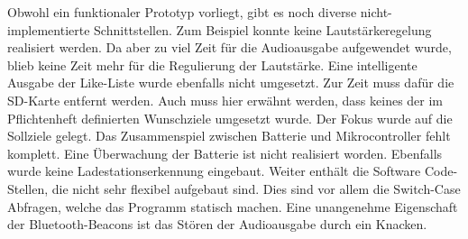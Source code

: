 Obwohl ein funktionaler Prototyp vorliegt, gibt es noch diverse nicht-implementierte Schnittstellen. Zum Beispiel konnte keine Lautstärkeregelung realisiert werden. Da aber zu viel Zeit für die Audioausgabe aufgewendet wurde, blieb keine Zeit mehr für die Regulierung der Lautstärke. Eine intelligente Ausgabe der {\glqq Like-Liste\grqq} wurde ebenfalls nicht umgesetzt. Zur Zeit muss dafür die SD-Karte entfernt werden. Auch muss hier erwähnt werden, dass keines der im Pflichtenheft definierten Wunschziele umgesetzt wurde. Der Fokus wurde auf die Sollziele gelegt. Das Zusammenspiel zwischen Batterie und Mikrocontroller fehlt komplett. Eine Überwachung der Batterie ist nicht realisiert worden. Ebenfalls wurde keine Ladestationserkennung eingebaut. Weiter enthält die Software Code-Stellen, die nicht sehr flexibel aufgebaut sind. Dies sind vor allem die Switch-Case Abfragen, welche das Programm statisch machen. Eine unangenehme Eigenschaft der Bluetooth-Beacons ist das Stören der Audioausgabe durch ein {\glqq Knacken\grqq}.
 
